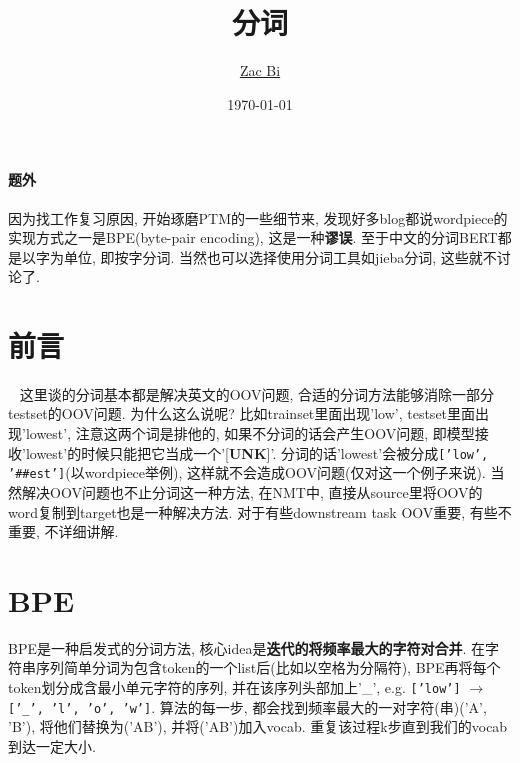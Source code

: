 \documentclass{article}
\begin{document}
\begin{titlepage}
    \title{分词}
    \author{\href{https://github.com/ZacBi}{Zac Bi}}
    \date{\today}
    \maketitle
    \pagestyle{empty}
\end{titlepage}

\paragraph{题外}
因为找工作复习原因, 开始琢磨PTM的一些细节来,
发现好多blog都说wordpiece的实现方式之一是BPE(byte-pair encoding), 这是一种\textbf{谬误}.
至于中文的分词BERT都是以字为单位, 即按字分词. 当然也可以选择使用分词工具如jieba分词, 这些就不讨论了.

\section{前言}

\paragraph{}~{}
这里谈的分词基本都是解决英文的OOV问题, 合适的分词方法能够消除一部分testset的OOV问题. 为什么这么说呢?
比如trainset里面出现'low', testset里面出现'lowest', 注意这两个词是排他的, 如果不分词的话会产生OOV问题,
即模型接收'lowest'的时候只能把它当成一个'[\textbf{UNK}]'.
分词的话'lowest'会被分成\texttt{['low', '\#\#est']}(以wordpiece举例), 这样就不会造成OOV问题(仅对这一个例子来说).
当然解决OOV问题也不止分词这一种方法, 在NMT中, 直接从source里将OOV的word复制到target也是一种解决方法.
对于有些downstream task OOV重要, 有些不重要, 不详细讲解.


\section{BPE}

BPE是一种启发式的分词方法, 核心idea是\textbf{迭代的将频率最大的字符对合并}.
在字符串序列简单分词为包含token的一个list后(比如以空格为分隔符), BPE再将每个token划分成含最小单元字符的序列,
并在该序列头部加上'\_', e.g. \texttt{['low']} $\rightarrow$ \texttt{['\_', 'l', 'o', 'w']}.
算法的每一步, 都会找到频率最大的一对字符(串)('A', 'B'), 将他们替换为('AB'), 并将('AB')加入vocab.
重复该过程k步直到我们的vocab到达一定大小.
\end{document}
